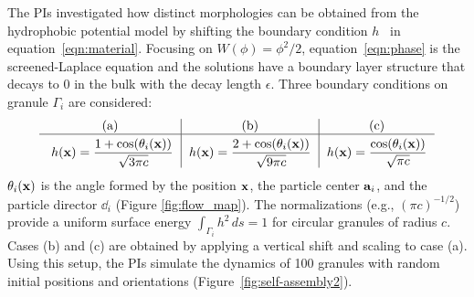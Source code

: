 The PIs investigated how distinct morphologies can be obtained from the
hydrophobic potential model by shifting the boundary condition
$h$~\cite{fu-ryh-qua-you2022} in equation~\eqref{eqn:material}. Focusing
on $W(\phi) = \phi^2/2$, equation~\eqref{eqn:phase} is the
screened-Laplace equation and the solutions have a boundary layer
structure that decays to $0$ in the bulk with the decay length
$\epsilon$. Three boundary conditions on granule $\Gamma_i$ are
considered:
\begin{equation}
  \label{eq:bcs}
  \begin{tabular}{c|c|c}
     \text{(a)} & \text{(b)} & \text{(c)} \\
    \hline
    \rule{0pt}{4ex} 
      $h(\mathbf{x}) = \displaystyle \frac{1+\cos (\theta_i(\xx))}{\sqrt{3\pi c}}$
    & $h(\mathbf{x}) = \displaystyle \frac{2+\cos (\theta_i(\xx))}{\sqrt{9\pi c}}$
    & $h(\mathbf{x}) = \displaystyle \frac{\cos (\theta_i(\xx))}{\sqrt{\pi c}}$
\end{tabular}
\end{equation}
$\theta_i(\xx)$ is the angle formed by the position $\xx$,
the particle center $\aa_i$, and the particle director $\dd_i$ (Figure
\ref{fig:flow_map}). The normalizations (e.g., $(\pi c)^{-1/2}$) provide
a uniform surface energy $\int_{\Gamma_i} h^2 \,ds = 1$ for circular
granules of radius $c$. Cases (b) and (c) are obtained by applying
a vertical shift and scaling to case (a). Using this setup, the PIs
simulate the dynamics of 100 granules with random initial positions and
orientations (Figure~\ref{fig:self-assembly2}).

